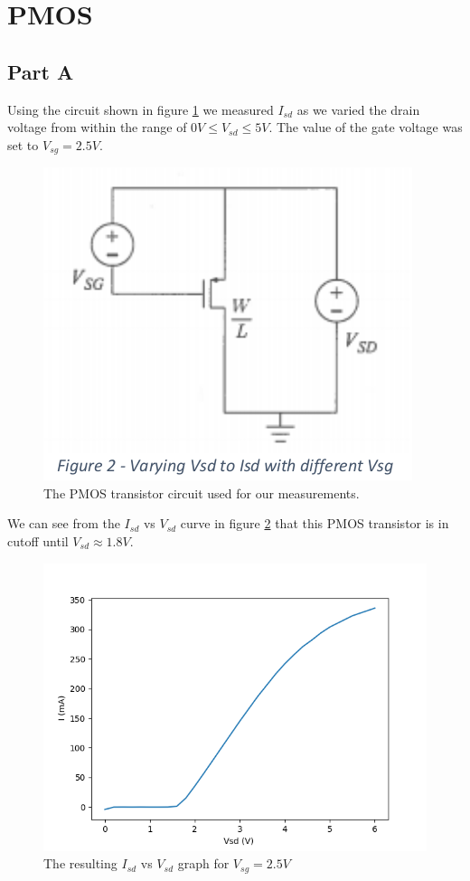\section{PMOS}
\subsection{Part A}
Using the circuit shown in figure \ref{fig:pmos_circuit} we measured $I_{sd}$ as we varied the drain voltage from within the range of $0 V \le V_{sd} \le 5 V$. 
The value of the gate voltage was set to $V_{sg} = 2.5V$. 
\\

\FloatBarrier

\begin{figure}[h!]
	\centering
	\includegraphics[scale=0.75]{./images/pmos_circuit}
	\caption{The PMOS transistor circuit used for our measurements.}
	\label{fig:pmos_circuit}
\end{figure}

\FloatBarrier
We can see from the $I_{sd}$ vs $V_{sd}$ curve in figure \ref{fig:pmos} that this PMOS transistor is in cutoff until $V_{sd} \approx 1.8 V$. 

\FloatBarrier

\begin{figure}[h!]
	\centering
	\includegraphics[scale=0.75]{./data/pmos.png}
	\caption{The resulting $I_{sd}$ vs $V_{sd}$ graph for $V_{sg}=2.5V$}
	\label{fig:pmos}
\end{figure}

